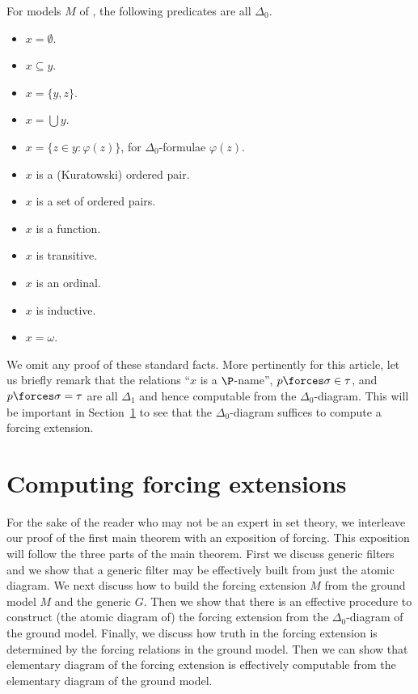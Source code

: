 \documentclass{amsart}
\begin{document}
 \begin{lemma}
 \label{lemma:Delta1}
 For models $M$ of \ZFC, the following predicates are all $\Delta_0$.
 \begin{multicols}{2}
 \begin{itemize}
 \item $x=\emptyset$.
 \item $x \subseteq y$.
 \item $x = \{y,z\}$.
 \item $x = \bigcup y$.
 \item $x = \{ z \in y : \varphi(z) \}$, for $\Delta_0$-formulae $\varphi(z)$.
 \item $x$ is a (Kuratowski) ordered pair.
 \item $x$ is a set of ordered pairs.
 \item $x$ is a function.
 \item $x$ is transitive.
 \item $x$ is an ordinal.
 \item $x$ is inductive.
 \item $x=\omega$.
 \end{itemize}
 \end{multicols}
 \end{lemma}
 
 We omit any proof of these standard facts. More pertinently for this article, let us briefly remark that the relations ``$x$ is a $\P$-name'', $p \forces \sigma \in \tau$, and $p \forces \sigma = \tau$ are all $\Delta_1$ and hence computable from the $\Delta_0$-diagram. This will be important in Section~\ref{Section.Computing-forcing-extensions} to see that the $\Delta_0$-diagram suffices to compute a forcing extension.
 
 \section{Computing forcing extensions}\label{Section.Computing-forcing-extensions}
 
 For the sake of the reader who may not be an expert in set theory, we interleave our proof of the first main theorem with an exposition of forcing. This exposition will follow the three parts of the main theorem. First we discuss generic filters and we show that a generic filter may be effectively built from just the atomic diagram. We next discuss how to build the forcing extension $M$ from the ground model $M$ and the generic $G$. Then we show that there is an effective procedure to construct (the atomic diagram of) the forcing extension from the $\Delta_0$-diagram of the ground model. Finally, we discuss how truth in the forcing extension is determined by the forcing relations in the ground model. Then we can show that elementary diagram of the forcing extension is effectively computable from the elementary diagram of the ground model.
 
\end{document}
